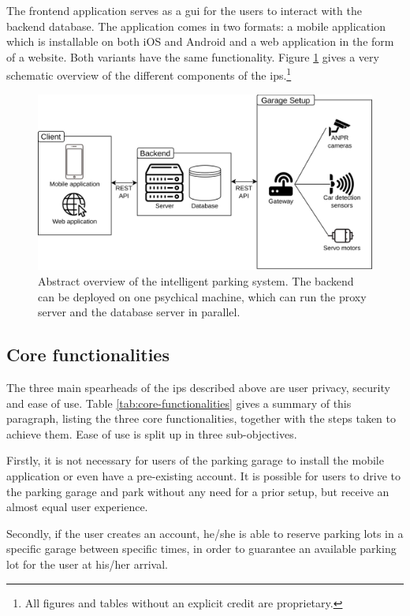 The frontend application serves as a \ac{gui} for the users to interact with the backend database. The application comes in two formats: a mobile application which is installable on both iOS and Android and a web application in the form of a website. Both variants have the same functionality. Figure \ref{fig:abstract-diagram} gives a very schematic overview of the different components of the \ac{ips}.\footnote{All figures and tables without an explicit credit are proprietary.}

\begin{figure}[htp]
    \centering
    \includegraphics[width=12cm]{images/misc/abstract_diagram.drawio.png}
    \caption[Abstract overview of the intelligent parking system.]{Abstract overview of the intelligent parking system. The backend can be deployed on one psychical machine, which can run the proxy server and the database server in parallel.}
    \label{fig:abstract-diagram}
\end{figure}


\subsection{Core functionalities}\label{sec:core-functionalities}
The three main spearheads of the \ac{ips} described above are user privacy, security and ease of use. Table \ref{tab:core-functionalities} gives a summary of this paragraph, listing the three core functionalities, together with the steps taken to achieve them.
\ind Ease of use is split up in three sub-objectives.

\ind Firstly, it is not necessary for users of the parking garage to install the mobile application or even have a pre-existing account. It is possible for users to drive to the parking garage and park without any need for a prior setup, but receive an almost equal user experience.

\ind Secondly, if the user creates an account, he/she is able to reserve parking lots in a specific garage between specific times, in order to guarantee an available parking lot for the user at his/her arrival.

